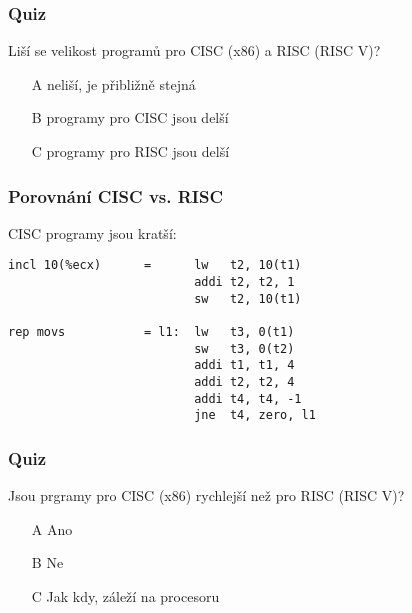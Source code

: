 \documentclass{beamer}
\begin{document}
\begin{frame}
\frametitle{Quiz}
Liší se velikost programů pro CISC (x86) a RISC (RISC V)?
\begin{itemize}
\item[A] neliší, je přibližně stejná
\item[B] programy pro CISC jsou delší
\item[C] programy pro RISC jsou delší
\end{itemize}

\end{frame}


\begin{frame}[fragile]
\frametitle{Porovnání CISC vs. RISC}
CISC programy jsou kratší:
\begin{lstlisting}[language={[x86masm]Assembler},columns=flexible]
incl 10(%ecx)      =      lw   t2, 10(t1)
                          addi t2, t2, 1
                          sw   t2, 10(t1)

rep movs           = l1:  lw   t3, 0(t1) 
                          sw   t3, 0(t2)
                          addi t1, t1, 4
                          addi t2, t2, 4
                          addi t4, t4, -1
                          jne  t4, zero, l1 
\end{lstlisting}

\end{frame}

\begin{frame}
\frametitle{Quiz}
Jsou prgramy pro CISC (x86) rychlejší než pro RISC (RISC V)?
\begin{itemize}
\item[A] Ano 
\item[B] Ne
\item[C] Jak kdy, záleží na procesoru
\end{itemize}

\end{frame}
\end{document}

